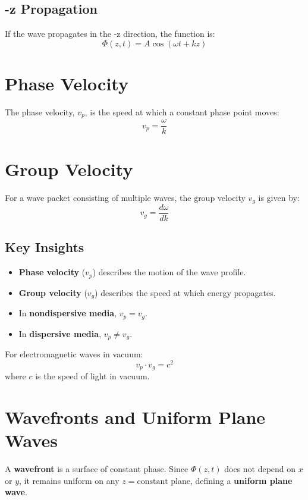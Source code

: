 \documentclass{article}
\begin{document}
\subsection{-z Propagation}
If the wave propagates in the -z direction, the function is:
\begin{equation}
    \Phi(z,t) = A \cos(\omega t + k z)
\end{equation}

\section{Phase Velocity}
The phase velocity, \( v_p \), is the speed at which a constant phase point moves:
\begin{equation}
    v_p = \frac{\omega}{k}
\end{equation}

\section{Group Velocity}
For a wave packet consisting of multiple waves, the group velocity \( v_g \) is given by:
\begin{equation}
    v_g = \frac{d\omega}{dk}
\end{equation}

\subsection{Key Insights}
\begin{itemize}
    \item \textbf{Phase velocity} (\( v_p \)) describes the motion of the wave profile.
    \item \textbf{Group velocity} (\( v_g \)) describes the speed at which energy propagates.
    \item In \textbf{nondispersive media}, \( v_p = v_g \).
    \item In \textbf{dispersive media}, \( v_p \neq v_g \).
\end{itemize}

For electromagnetic waves in vacuum:
\begin{equation}
    v_p \cdot v_g = c^2
\end{equation}
where \( c \) is the speed of light in vacuum.

\section{Wavefronts and Uniform Plane Waves}
A \textbf{wavefront} is a surface of constant phase. Since \( \Phi(z,t) \) does not depend on \( x \) or \( y \), it remains uniform on any \( z = \text{constant} \) plane, defining a \textbf{uniform plane wave}.
\end{document}
